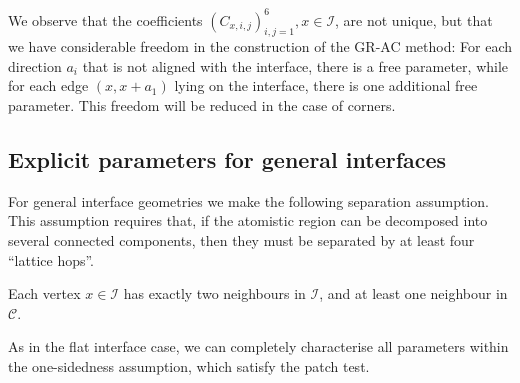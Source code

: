 \documentclass[12pt, reqno, a4paper]{amsart}
\numberwithin{equation}{section}
\numberwithin{theorem}{section}
\numberwithin{remark}{section}
\begin{document}
\begin{remark}
  We observe that the coefficients $(C_{x,i,j})_{i,j = 1}^6, x \in
  {\mathcal{I}}$, are not unique, but that we have considerable freedom in the
  construction of the GR-AC method: For each direction $a_i$ that is
  not aligned with the interface, there is a free parameter, while for
  each edge $(x, x+a_1)$ lying on the interface, there is one
  additional free parameter. This freedom will be reduced in the case
  of corners.
\end{remark}

\subsection{Explicit parameters for general interfaces}
\label{sec:construction:corners}
For general interface geometries we make the following separation
assumption. This assumption requires that, if the atomistic region can
be decomposed into several connected components, then they must be
separated by at least four ``lattice hops''.

\begin{assumption}
  \label{th:geninterface}
  Each vertex $x\in{\mathcal{I}}$ has exactly two neighbours in ${\mathcal{I}}$, and at
  least one neighbour in ${\mathcal{C}}$.
\end{assumption}

\medskip
As in the flat interface case, we can completely characterise all
parameters within the one-sidedness assumption, which satisfy the
patch test.
\end{document}
